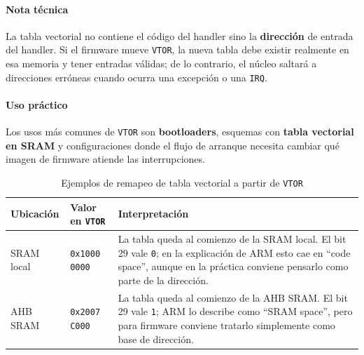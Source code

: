 \paragraph{Nota t\'ecnica}
La tabla vectorial no contiene el c\'odigo del handler sino la \textbf{direcci\'on} de entrada del handler. Si el firmware mueve \texttt{VTOR}, la nueva tabla debe existir realmente en esa memoria y tener entradas v\'alidas; de lo contrario, el n\'ucleo saltar\'a a direcciones err\'oneas cuando ocurra una excepci\'on o una \texttt{IRQ}.

\paragraph{Uso pr\'actico}
Los usos m\'as comunes de \texttt{VTOR} son \textbf{bootloaders}, esquemas con \textbf{tabla vectorial en SRAM} y configuraciones donde el flujo de arranque necesita cambiar qu\'e imagen de firmware atiende las interrupciones.

\begin{table}[H]
  \centering
  \small
  \renewcommand{\arraystretch}{1.15}
  \caption{Ejemplos de remapeo de tabla vectorial a partir de \texttt{VTOR}}
  \begin{tabularx}{0.96\textwidth}{|>{\raggedright\arraybackslash}p{}|>{\raggedright\arraybackslash}p{}|>{\raggedright\arraybackslash}X|}
    \hline
    \textbf{Ubicaci\'on} & \textbf{Valor en \texttt{VTOR}} & \textbf{Interpretaci\'on} \\
    \hline
    SRAM local & \texttt{0x1000 0000} & La tabla queda al comienzo de la SRAM local. El bit 29 vale \texttt{0}; en la explicaci\'on de ARM esto cae en ``code space'', aunque en la pr\'actica conviene pensarlo como parte de la direcci\'on. \\
    \hline
    AHB SRAM & \texttt{0x2007 C000} & La tabla queda al comienzo de la AHB SRAM. El bit 29 vale \texttt{1}; ARM lo describe como ``SRAM space'', pero para firmware conviene tratarlo simplemente como base de direcci\'on. \\
    \hline
  \end{tabularx}
\end{table}

